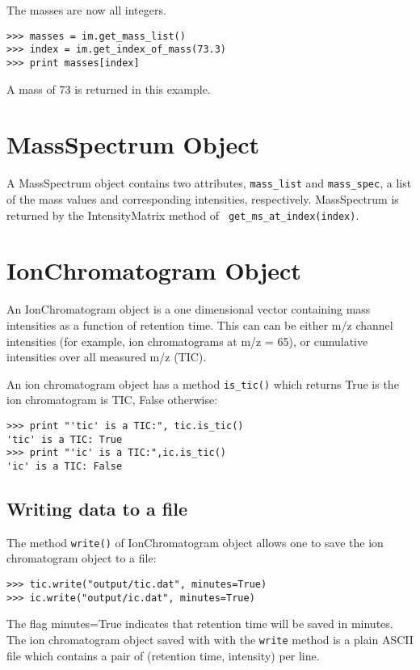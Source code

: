 The masses are now all integers.
\begin{verbatim}
>>> masses = im.get_mass_list()
>>> index = im.get_index_of_mass(73.3)
>>> print masses[index]
\end{verbatim}

A mass of 73 is returned in this example.

\section{MassSpectrum Object}

\noindent
A MassSpectrum object contains two attributes, {\tt mass\_list} and
{\tt mass\_spec}, a list of the mass values and corresponding intensities,
respectively. MassSpectrum is returned by the IntensityMatrix method of {\tt
get\_ms\_at\_index(index)}.

\section{IonChromatogram Object}

\noindent
An IonChromatogram object is a one dimensional vector containing
mass intensities as a function of retention time. This can can be either
m/z channel intensities (for example, ion chromatograms at m/z = 65),
or cumulative intensities over all measured m/z (TIC).

An ion chromatogram object has a method {\tt is\_tic()} which returns
True is the ion chromatogram is TIC, False otherwise:

\begin{verbatim}
>>> print "'tic' is a TIC:", tic.is_tic()
'tic' is a TIC: True
>>> print "'ic' is a TIC:",ic.is_tic()
'ic' is a TIC: False
\end{verbatim}

\subsection{Writing data to a file}

The method {\tt write()} of IonChromatogram object allows one to save
the ion chromatogram object to a file:

\begin{verbatim}
>>> tic.write("output/tic.dat", minutes=True)
>>> ic.write("output/ic.dat", minutes=True)
\end{verbatim}

\noindent
The flag minutes=True indicates that retention time will be saved in minutes.
The ion chromatogram object saved with with the {\tt write{}} method is a
plain ASCII file which contains a pair of (retention time, intensity) per
line.

